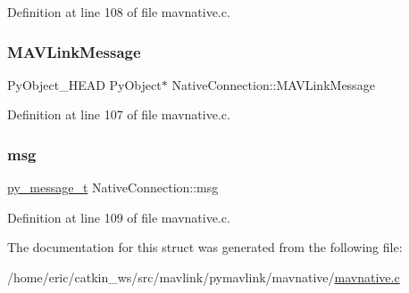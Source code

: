 Definition at line 108 of file mavnative.\+c.

\mbox{\label{structNativeConnection_a6e972be69603d3a7c4a733476aaa5879}} 
\subsubsection{\texorpdfstring{MAVLinkMessage}{MAVLinkMessage}}
{\footnotesize\ttfamily Py\+Object\+\_\+\+H\+E\+AD Py\+Object$\ast$ Native\+Connection\+::\+M\+A\+V\+Link\+Message}



Definition at line 107 of file mavnative.\+c.

\mbox{\label{structNativeConnection_a593cfa273b85b9065e6699b46507cf98}} 
\subsubsection{\texorpdfstring{msg}{msg}}
{\footnotesize\ttfamily \mbox{\hyperlink{structpy__message__t}{py\+\_\+message\+\_\+t}} Native\+Connection\+::msg}



Definition at line 109 of file mavnative.\+c.



The documentation for this struct was generated from the following file\+:\begin{DoxyCompactItemize}
\item 
/home/eric/catkin\+\_\+ws/src/mavlink/pymavlink/mavnative/\mbox{\hyperlink{mavnative_8c}{mavnative.\+c}}\end{DoxyCompactItemize}
